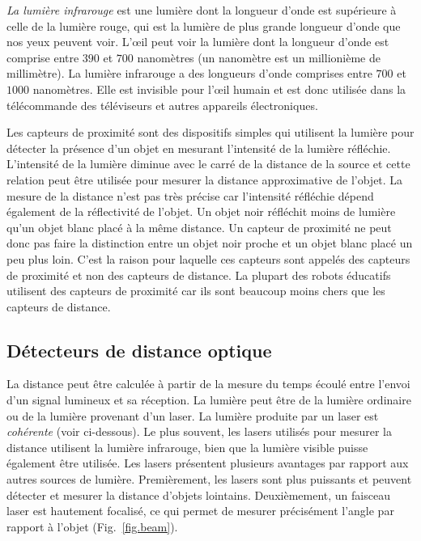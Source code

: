 \emph{La lumière infrarouge} est une lumière dont la longueur d'onde est supérieure à celle de la lumière rouge, qui est la lumière de plus grande longueur d'onde que nos yeux peuvent voir. L'œil peut voir la lumière dont la longueur d'onde est comprise entre $390$ et $700$ nanomètres (un nanomètre est un millionième de millimètre). La lumière infrarouge a des longueurs d'onde comprises entre $700$ et $1000$ nanomètres. Elle est invisible pour l'œil humain et est donc utilisée dans la télécommande des téléviseurs et autres appareils électroniques.

Les capteurs de proximité sont des dispositifs simples qui utilisent la lumière pour détecter la présence d'un objet en mesurant l'intensité de la lumière réfléchie. L'intensité de la lumière diminue avec le carré de la distance de la source et cette relation peut être utilisée pour mesurer la distance approximative de l'objet. La mesure de la distance n'est pas très précise car l'intensité réfléchie dépend également de la réflectivité de l'objet. Un objet noir réfléchit moins de lumière qu'un objet blanc placé à la même distance. Un capteur de proximité ne peut donc pas faire la distinction entre un objet noir proche et un objet blanc placé un peu plus loin. C'est la raison pour laquelle ces capteurs sont appelés des capteurs de proximité et non des capteurs de distance. La plupart des robots éducatifs utilisent des capteurs de proximité car ils sont beaucoup moins chers que les capteurs de distance.

\subsection{Détecteurs de distance optique}\label{s.distance optique}

La distance peut être calculée à partir de la mesure du temps écoulé entre l'envoi d'un signal lumineux et sa réception. La lumière peut être de la lumière ordinaire ou de la lumière provenant d'un laser. La lumière produite par un laser est \emph{cohérente} (voir ci-dessous).  Le plus souvent, les lasers utilisés pour mesurer la distance utilisent la lumière infrarouge, bien que la lumière visible puisse également être utilisée. Les lasers présentent plusieurs avantages par rapport aux autres sources de lumière. Premièrement, les lasers sont plus puissants et peuvent détecter et mesurer la distance d'objets lointains. Deuxièmement, un faisceau laser est hautement focalisé, ce qui permet de mesurer précisément l'angle par rapport à l'objet (Fig.~\ref{fig.beam}).

